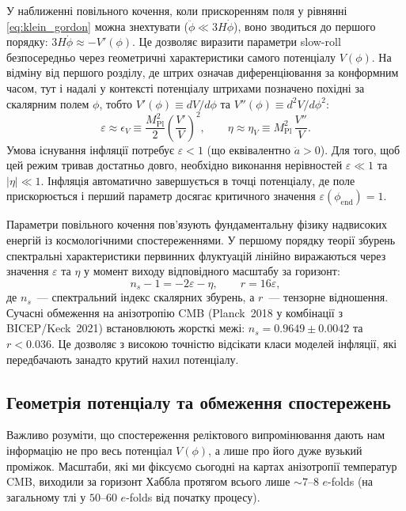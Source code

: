 \documentclass[12pt, a4paper]{article}
\begin{document}
У наближенні повільного кочення, коли прискоренням поля у рівнянні \eqref{eq:klein_gordon} можна знехтувати ($\ddot{\phi} \ll 3H\dot{\phi}$), воно зводиться до першого порядку: $3H\dot{\phi} \approx -V'(\phi)$. Це дозволяє виразити параметри slow-roll безпосередньо через геометричні характеристики самого потенціалу $V(\phi)$. На відміну від першого розділу, де штрих означав диференціювання за конформним часом, тут і надалі у контексті потенціалу штрихами позначено похідні за скалярним полем $\phi$, тобто $V'(\phi) \equiv dV/d\phi$ та $V''(\phi) \equiv d^2V/d\phi^2$:
\begin{equation}\label{eq:slow_roll_pot}
  \varepsilon \approx \epsilon_V \equiv \frac{M_\mathrm{Pl}^2}{2}\left(\frac{V'}{V}\right)^2,
  \qquad
  \eta \approx \eta_V \equiv M_\mathrm{Pl}^2\,\frac{V''}{V}.
\end{equation}
Умова існування інфляції потребує $\varepsilon < 1$ (що еквівалентно $\ddot{a} > 0$). Для того, щоб цей режим тривав достатньо довго, необхідно виконання нерівностей $\varepsilon \ll 1$ та $|\eta| \ll 1$. Інфляція автоматично завершується в точці потенціалу, де поле прискорюється і перший параметр досягає критичного значення $\varepsilon(\phi_\mathrm{end}) = 1$.



Параметри повільного кочення пов'язують фундаментальну фізику надвисоких енергій із космологічними спостереженнями. У першому порядку теорії збурень спектральні характеристики первинних флуктуацій лінійно виражаються через значення $\varepsilon$ та $\eta$ у момент виходу відповідного масштабу за горизонт:
\begin{equation}\label{eq:ns_r_slow_roll}
  n_s - 1 = -2\varepsilon - \eta, \qquad r = 16\varepsilon,
\end{equation}
де $n_s$~--- спектральний індекс скалярних збурень, а $r$~--- тензорне відношення. Сучасні обмеження на анізотропію CMB (Planck~2018 у комбінації з BICEP/Keck~2021) встановлюють жорсткі межі: $n_s = 0.9649 \pm 0.0042$ та $r < 0.036$. Це дозволяє з високою точністю відсікати класи моделей інфляції, які передбачають занадто крутий нахил потенціалу.

\subsection{Геометрія потенціалу та обмеження спостережень}

Важливо розуміти, що спостереження реліктового випромінювання дають нам інформацію не про весь потенціал $V(\phi)$, а лише про його дуже вузький проміжок. Масштаби, які ми фіксуємо сьогодні на картах анізотропії температур CMB, виходили за горизонт Хаббла протягом всього лише $\sim\!7$--$8$ $e$-folds (на загальному тлі у $50$--$60$ $e$-folds від початку процесу).
\end{document}
